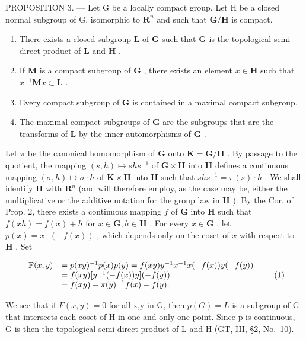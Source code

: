 PROPOSITION 3. --- Let G be a locally compact group. Let H be a closed normal subgroup of G, isomorphic to \(\mathbf{R}^n\) and such that \(\mathbf{G} / \mathbf{H}\) is compact.

\begin{enumerate}
\def\labelenumi{\alph{enumi})}
\item
  There exists a closed subgroup \(\mathbf{L}\) of \(\mathbf{G}\) such that \(\mathbf{G}\) is the topological semi-direct product of \(\mathbf{L}\) and \(\mathbf{H}\) .
\item
  If \(\mathbf{M}\) is a compact subgroup of \(\mathbf{G}\) , there exists an element \(x \in \mathbf{H}\) such that \(x^{-1}\mathbf{M}x \subset \mathbf{L}\) .
\item
  Every compact subgroup of \(\mathbf{G}\) is contained in a maximal compact subgroup.
\item
  The maximal compact subgroups of \(\mathbf{G}\) are the subgroups that are the transforms of \(\mathbf{L}\) by the inner automorphisms of \(\mathbf{G}\) .
\end{enumerate}

Let \(\pi\) be the canonical homomorphism of \(\mathbf{G}\) onto \(\mathbf{K} = \mathbf{G} / \mathbf{H}\) . By passage to the quotient, the mapping \((s,h)\mapsto shs^{-1}\) of \(\mathbf{G}\times \mathbf{H}\) into \(\mathbf{H}\) defines a continuous mapping \((\sigma ,h)\mapsto \sigma \cdot h\) of \(\mathbf{K}\times \mathbf{H}\) into \(\mathbf{H}\) such that \(shs^{-1} = \pi (s)\cdot h\) . We shall identify \(\mathbf{H}\) with \(\mathbf{R}^n\) (and will therefore employ, as the case may be, either the multiplicative or the additive notation for the group law in \(\mathbf{H}\) ). By the Cor. of Prop. 2, there exists a continuous mapping \(f\) of \(\mathbf{G}\) into \(\mathbf{H}\) such that \(f(xh) = f(x) + h\) for \(x\in \mathbf{G}, h\in \mathbf{H}\) . For every \(x\in \mathbf{G}\) , let \(p(x) = x\cdot (-f(x))\) , which depends only on the coset of \(x\) with respect to \(\mathbf{H}\) . Set

\[
\begin{array}{r l} \mathrm{F} (x, y) & = p (x y) ^ {- 1} p (x) p (y) = f (x y) y ^ {- 1} x ^ {- 1} x (- f (x)) y (- f (y)) \\ & = f (x y) [ y ^ {- 1} (- f (x)) y ] (- f (y)) \\ & = f (x y) - \pi (y) ^ {- 1} f (x) - f (y). \end{array}\tag{1}
\]

We see that if \(F(x,y) = 0\) for all x,y in G, then \(p(G) = L\) is a subgroup of G that intersects each coset of H in one and only one point. Since p is continuous, G is then the topological semi-direct product of L and H (GT, III, §2, No.~10).

